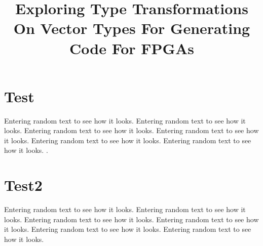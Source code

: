 \documentclass[conference]{IEEEtran}
\begin{document}
\title{Exploring Type Transformations On Vector Types For Generating Code For FPGAs}

\author{
}


\maketitle




\section{Test}
Entering random text to see how it looks.
Entering random text to see how it looks.
Entering random text to see how it looks.
Entering random text to see how it looks.
Entering random text to see how it looks.
Entering random text to see how it looks. \cite{halting}. 

\section{Test2}
Entering random text to see how it looks.
Entering random text to see how it looks.
Entering random text to see how it looks.
Entering random text to see how it looks.
Entering random text to see how it looks.
Entering random text to see how it looks.



 
\end{document}
